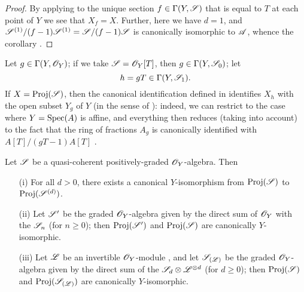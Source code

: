 \begin{proof}
By applying  to the unique section $f\in\Gamma(Y,\mathscr{S})$ that is equal to $T$ at each point of $Y$ we see that $X_f=X$.
Further, here we have $d=1$, and $\mathscr{S}^{(1)}/(f-1)\mathscr{S}^{(1)}=\mathscr{S}/(f-1)\mathscr{S}$ is canonically isomorphic to $\mathscr{A}$, whence the corollary .
\end{proof}

Let $g\in\Gamma(Y,\mathscr{O}_Y)$;
if we take $\mathscr{S}=\mathscr{O}_Y[T]$, then $g\in\Gamma(Y,\mathscr{S}_0)$;
let
\[
  h = gT\in\Gamma(Y,\mathscr{S}_1).
\]
If $X={\mathop{\mathrm{Proj}}\nolimits}(\mathscr{S})$, then the canonical identification defined in  identifies $X_h$ with the open subset $Y_g$ of $Y$ (in the sense of ):
indeed, we can restrict to the case where $Y={\mathop{\mathrm{Spec}}\nolimits}(A)$ is affine, and everything then reduces (taking  into account) to the fact that the ring of fractions $A_g$ is canonically identified with $A[T]/(gT-1)A[T]$ .

\begin{proposition}[3.1.8]
\label{II.3.1.8}
Let $\mathscr{S}$ be a quasi-coherent positively-graded $\mathscr{O}_Y$-algebra.
Then
\begin{enumerate}
  \item[(i)] For all $d>0$, there exists a canonical $Y$-isomorphism from ${\mathop{\mathrm{Proj}}\nolimits}(\mathscr{S})$ to ${\mathop{\mathrm{Proj}}\nolimits}(\mathscr{S}^{(d)})$.
  \item[(ii)] Let $\mathscr{S}'$ be the graded $\mathscr{O}_Y$-algebra given by the direct sum of $\mathscr{O}_Y$ with the $\mathscr{S}_n$ (for $n\geq0$);
    then ${\mathop{\mathrm{Proj}}\nolimits}(\mathscr{S}')$ and ${\mathop{\mathrm{Proj}}\nolimits}(\mathscr{S})$ are canonically $Y$-isomorphic.
  \item[(iii)] Let $\mathscr{L}$ be an invertible $\mathscr{O}_Y$-module , and let $\mathscr{S}_{(\mathscr{L})}$ be the graded $\mathscr{O}_Y$-algebra given by the direct sum of the $\mathscr{S}_d\otimes\mathscr{L}^{\otimes d}$ (for $d\geq0$);
    then ${\mathop{\mathrm{Proj}}\nolimits}(\mathscr{S})$ and ${\mathop{\mathrm{Proj}}\nolimits}(\mathscr{S}_{(\mathscr{L})})$ are canonically $Y$-isomorphic.
\end{enumerate}
\end{proposition}

